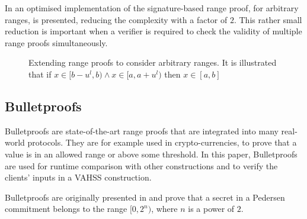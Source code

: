 In \cite{arbitary_range_opt} an optimised implementation of the signature-based range proof, for arbitrary ranges, is presented, reducing the complexity with a factor of $2$. This rather small reduction is important when a verifier is required to check the validity of multiple range proofs simultaneously.

\begin{figure}[]
    \centering
    \caption{Extending range proofs to consider arbitrary ranges. It is illustrated that if $x\in[b-u^l,b)\wedge x\in[a,a+u^l)$ then $x\in[a,b]$}
    \label{fig:interval}
\end{figure}


\subsection*{Bulletproofs}
Bulletproofs are state-of-the-art range proofs that are integrated into many real-world protocols. They are for example used in crypto-currencies, to prove that a value is in an allowed range or above some threshold. In this paper, Bulletproofs are used for runtime comparison with other constructions and to verify the clients' inputs in a VAHSS construction.


Bulletproofs are originally presented in \cite{bulletProofs_theory} and prove that a secret in a Pedersen commitment belongs to the range $[0,2^n)$, where $n$ is  a power of $2$. 

